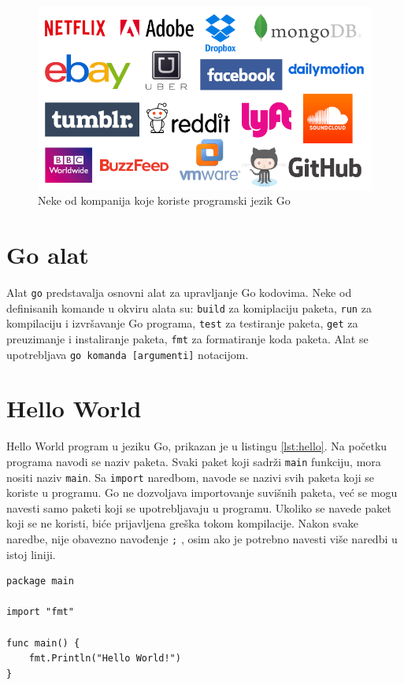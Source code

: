\documentclass[12pt,oneside]{memoir}
\begin{document}
\begin{figure}
\begin{center}
\includegraphics[scale=2]{companies.png}
\end{center}
\caption{Neke od kompanija koje koriste programski jezik Go}
\label{fig:comp}
\end{figure}

\section{Go alat}

Alat \texttt{go} predstavalja osnovni alat za upravljanje Go kodovima. Neke od definisanih komande u okviru alata su: \texttt{build} za komiplaciju paketa, \texttt{run} za kompilaciju i izvršavanje Go programa, \texttt{test} za testiranje paketa, \texttt{get} za preuzimanje i instaliranje paketa, \texttt{fmt} za formatiranje koda paketa. Alat se upotrebljava \texttt{go komanda [argumenti]} notacijom.

\section{Hello World}
Hello World program u jeziku Go, prikazan je u listingu \ref{lst:hello}. Na početku programa navodi se naziv paketa. Svaki paket koji sadrži \texttt{main} funkciju, mora nositi naziv \texttt{main}. Sa \texttt{import} naredbom, navode se nazivi svih paketa koji se koriste u programu. Go ne dozvoljava importovanje suvišnih paketa, već se mogu navesti samo paketi koji se upotrebljavaju u programu. Ukoliko se navede paket koji se ne koristi, biće prijavljena greška tokom kompilacije. Nakon svake naredbe, nije obavezno navođenje \texttt{;} , osim ako je potrebno navesti više naredbi u istoj liniji. 

\begin{center}
\begin{lstlisting}[caption=Hello World program u jeziku Go,label={lst:hello},  backgroundcolor=\color{background}]
package main

import "fmt"

func main() {
	fmt.Println("Hello World!")
}
\end{lstlisting}
\end{center}
\end{document}
